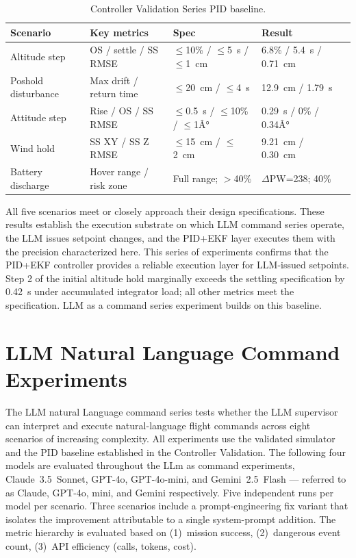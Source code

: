 \begin{table}[ht]
  \caption{Controller Validation Series PID baseline.}
  \label{tab:ch3_b_summary}
  \centering
  \small
  \begin{tabular}{lllll}
    \toprule
    Scenario & Key metrics & Spec & Result \\
    \midrule
    Altitude step       & OS / settle / SS RMSE & $\leq$10\% / $\leq$5~s / $\leq$1~cm & 6.8\% / 5.4~s / 0.71~cm \\
    Poshold disturbance & Max drift / return time & $\leq$20~cm / $\leq$4~s & 12.9~cm / 1.79~s \\
    Attitude step       & Rise / OS / SS RMSE     & $\leq$0.5~s / $\leq$10\% / $\leq$1Â° & 0.29~s / 0\% / 0.34Â° \\
    Wind hold           & SS XY / SS Z RMSE       & $\leq$15~cm / $\leq$2~cm & 9.21~cm / 0.30~cm \\
    Battery discharge   & Hover range / risk zone & Full range; $>$40\% & $\Delta$PW=238; 40\% \\
    \bottomrule
  \end{tabular}
\end{table}
All five scenarios meet or closely approach their design specifications. 
These results establish the execution substrate on which  LLM command series operate, the LLM issues setpoint changes, and the PID+EKF layer executes them with the precision characterized here.
This series of experiments confirms that the PID+EKF controller provides a reliable execution layer for LLM-issued setpoints. 
Step 2 of the initial altitude hold marginally exceeds the settling specification by 0.42~s under accumulated integrator load; all other metrics meet the specification.
LLM as a command series experiment builds on this baseline.

\newpage
\section{LLM Natural Language Command Experiments}
\label{sec:ch3_cseries}

The LLM natural Language command series tests whether the LLM supervisor can interpret and execute natural-language flight commands across eight scenarios of increasing
complexity. 
All experiments use the validated simulator and the PID baseline established in the Controller Validation.
The following four models are evaluated throughout the LLm as command experiments, Claude~3.5~Sonnet, GPT-4o, GPT-4o-mini, and Gemini~2.5~Flash --- referred to as Claude, GPT-4o, mini, and Gemini respectively.
Five independent runs per model per scenario.
Three scenarios include a prompt-engineering fix variant that isolates the improvement attributable to a single system-prompt addition.
The metric hierarchy is evaluated based on (1)~mission success, (2)~dangerous event count, (3)~API efficiency (calls, tokens, cost).

